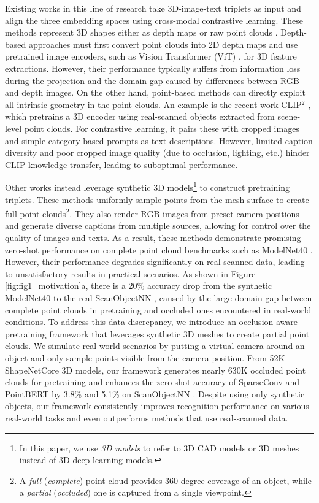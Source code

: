 Existing works in this line of research take 3D-image-text triplets as input and align the three embedding spaces using cross-modal contrastive learning. These methods represent 3D shapes either as depth maps \cite{opendlign,clip2point,pointclip,pointclipv2} or raw point clouds \cite{openshape,tamm,ulip,ulip2,uni3d,mixcon3d}. Depth-based approaches must first convert point clouds into 2D depth maps and use pretrained image encoders, such as Vision Transformer (ViT) \cite{vit}, for 3D feature extractions. However, their performance typically suffers from information loss during the projection and the domain gap caused by differences between RGB and depth images.
On the other hand, point-based methods \cite{ulip,openshape,ulip2,uni3d,mixcon3d,tamm}  can directly exploit all intrinsic geometry in the point clouds. An example is the recent work CLIP$^2$ \cite{clip2}, which pretrains a 3D encoder using real-scanned objects extracted from scene-level point clouds. For contrastive learning, it pairs these with cropped images and simple category-based prompts as text descriptions. 
However, limited caption diversity and poor cropped image quality (due to occlusion, lighting, etc.) hinder CLIP knowledge transfer, leading to suboptimal performance.

Other works \cite{ulip,ulip2,openshape,uni3d,mixcon3d,tamm} instead leverage synthetic 3D models\footnote{In this paper, we use \textit{3D models} to refer to 3D CAD models or 3D meshes instead of 3D deep learning models.} to construct pretraining triplets. These methods uniformly sample points from the mesh surface to create full point clouds\footnote{A \textit{full} (\textit{complete}) point cloud provides 360-degree coverage of an object, while a \textit{partial} (\textit{occluded}) one is captured from a single viewpoint.}. They also render RGB images from preset camera positions and generate diverse captions from multiple sources, allowing for control over the quality of images and texts. As a result, these methods demonstrate promising zero-shot performance on complete point cloud benchmarks such as ModelNet40 \cite{modelnet40}. However, their performance degrades significantly on real-scanned data, leading to unsatisfactory results in practical scenarios.  As shown in Figure \ref{fig:fig1_motivation}a, there is a 20\% accuracy drop from the synthetic ModelNet40 \cite{modelnet40} to the real ScanObjectNN \cite{scanobjectnn}, caused by the large domain gap between complete point clouds in pretraining and occluded ones encountered in real-world conditions.
To address this data discrepancy, we introduce an occlusion-aware pretraining framework that leverages synthetic 3D meshes to create partial point clouds. We simulate real-world scenarios by putting a virtual camera around an object and only sample points visible from the camera position. From 52K ShapeNetCore \cite{shapenet} 3D models, our framework generates nearly 630K occluded point clouds for pretraining and enhances the zero-shot accuracy of SparseConv \cite{sparseconv} and PointBERT \cite{pointbert} by 3.8\% and 5.1\% on ScanObjectNN \cite{scanobjectnn}. Despite using only synthetic objects, our framework consistently improves recognition performance on various real-world tasks and even outperforms methods that use real-scanned data.

